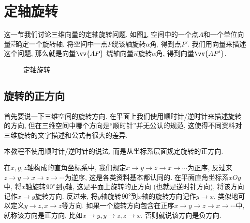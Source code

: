 \section{定轴旋转} \label{sec:3d-rotate}

这一节我们讨论三维向量的定轴旋转问题.
如图\ref{fig:3d-rotate},
空间中的一个点$A$和一个单位向量$\vec n$确定一个旋转轴.
将空间中一点$P$绕该轴旋转$\alpha$角, 得到点$P'$.
我们用向量来描述这个问题, 那么就是向量$\vv{AP}$
绕轴向量$\vec n$旋转$\alpha$角, 得到向量$\vv{AP'}$.

\begin{figure}[htbp]
  \centering
  \caption{定轴旋转}
  \label{fig:3d-rotate}
\end{figure}

\subsection{旋转的正方向}

首先要说一下三维空间的旋转方向.
在平面上我们使用顺时针/逆时针来描述旋转的方向,
但在三维空间中哪个方向是``顺时针''并无公认的规范,
这使得不同资料对三维旋转的文字描述和公式有很大的差异.

本教程不使用顺时针/逆时针的说法,
而是从坐标系层面规定旋转的正方向.

在$x,y,z$轴构成的直角坐标系中,
我们规定$x \to y \to z \to x \to \cdots$为正序,
反过来$z \to y \to x \to z \to \cdots$为逆序,
这是各类资料基本都认同的.
在平面直角坐标系$xOy$中,
将$x$轴旋转$90\degree$到$y$轴, 这是平面上旋转的正方向
(也就是逆时针方向), 将该方向记作$x \to y$旋转方向.
反过来, 将$y$轴旋转$90\degree$到$x$轴的旋转方向记作$y \to x$.
类似地可以定义$y\to z,x\to z$等方向.
如果一个旋转方向包含在正序$x \to y \to z \to x \to \cdots$中,
就称该方向是正方向, 比如$x\to y,y\to z,z\to x$.
否则就说该方向是负方向.

